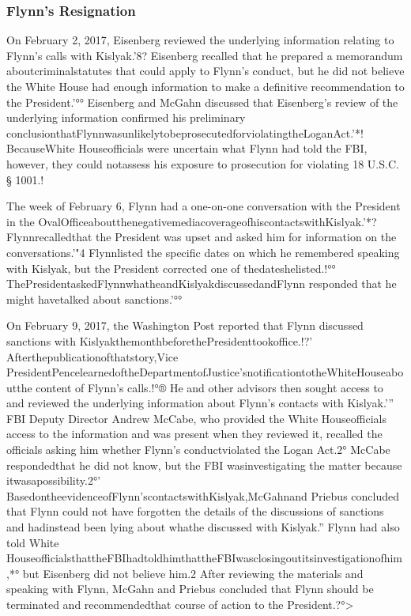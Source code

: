 \subsubsection{Flynn's Resignation}

On February 2, 2017, Eisenberg reviewed the underlying information relating to Flynn’s calls with Kislyak.'8? Eisenberg recalled that he prepared a memorandum aboutcriminalstatutes that could apply to Flynn’s conduct, but he did not believe the White House had enough information to make a definitive recommendation to the President.'°° Eisenberg and McGahn discussed that Eisenberg’s review of the underlying information confirmed his preliminary conclusionthatFlynnwasunlikelytobeprosecutedforviolatingtheLoganAct.'*! BecauseWhite Houseofficials were uncertain what Flynn had told the FBI, however, they could notassess his exposure to prosecution for violating 18 U.S.C. § 1001.!%

The week of February 6, Flynn had a one-on-one conversation with the President in the OvalOfficeaboutthenegativemediacoverageofhiscontactswithKislyak.'*? Flynnrecalledthat the President was upset and asked him for information on the conversations.'"4 Flynnlisted the specific dates on which he remembered speaking with Kislyak, but the President corrected one of thedateshelisted.!°° ThePresidentaskedFlynnwhatheandKislyakdiscussedandFlynn responded that he might havetalked about sanctions.'°°

On February 9, 2017, the Washington Post reported that Flynn discussed sanctions with KislyakthemonthbeforethePresidenttookoffice.!?’ Afterthepublicationofthatstory,Vice PresidentPencelearnedoftheDepartmentofJustice’snotificationtotheWhiteHouseaboutthe content of Flynn’s calls.!°® He and other advisors then sought access to and reviewed the underlying information about Flynn’s contacts with Kislyak.'” FBI Deputy Director Andrew McCabe, who provided the White Houseofficials access to the information and was present when they reviewed it, recalled the officials asking him whether Flynn’s conductviolated the Logan Act.2° McCabe respondedthat he did not know, but the FBI wasinvestigating the matter because itwasapossibility.2°' BasedontheevidenceofFlynn’scontactswithKislyak,McGahnand Priebus concluded that Flynn could not have forgotten the details of the discussions of sanctions and hadinstead been lying about whathe discussed with Kislyak.” Flynn had also told White HouseofficialsthattheFBIhadtoldhimthattheFBIwasclosingoutitsinvestigationofhim,*° but Eisenberg did not believe him.2 After reviewing the materials and speaking with Flynn, McGahn and Priebus concluded that Flynn should be terminated and recommendedthat course of action to the President.?°>

